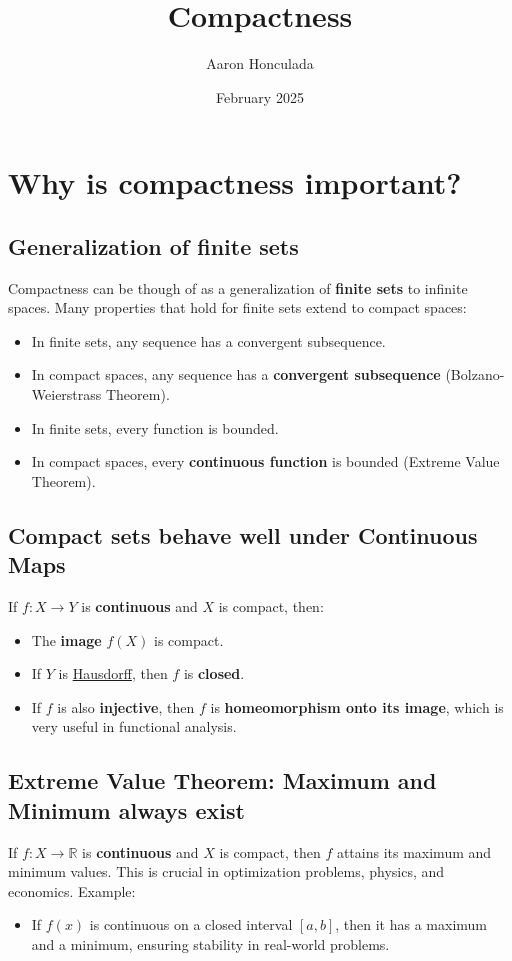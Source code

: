\documentclass{article}
\title{Compactness}
\author{Aaron Honculada}
\date{February 2025}
\begin{document}
\maketitle

\section{Why is compactness important?}
\subsection{Generalization of finite sets}
Compactness can be though of as a generalization of \textbf{finite sets} to infinite spaces. Many properties
that hold for finite sets extend to compact spaces:
\begin{itemize}
    \item In finite sets, any sequence has a convergent subsequence.
    \item In compact spaces, any sequence has a \textbf{convergent subsequence} (Bolzano-Weierstrass Theorem).
    \item In finite sets, every function is bounded.
    \item In compact spaces, every \textbf{continuous function} is bounded (Extreme Value Theorem).
\end{itemize}

\subsection{Compact sets behave well under Continuous Maps}
If $f: X \to Y$ is \textbf{continuous} and $X$ is compact, then:
\begin{itemize}
    \item The \textbf{image} $f(X)$ is compact.
    \item If $Y$ is \href{run:../hausdorff/hausdorff.pdf#nameddest=hausdorff-definition}{Hausdorff}, then $f$ is \textbf{closed}.
    \item If $f$ is also \textbf{injective}, then $f$ is \textbf{homeomorphism onto its image}, which
    is very useful in functional analysis.
\end{itemize}

\subsection{Extreme Value Theorem: Maximum and Minimum always exist}
If $f: X \to \mathbb{R}$ is \textbf{continuous} and $X$ is compact, then $f$ attains its maximum and minimum values.
This is crucial in optimization problems, physics, and economics.
Example:
\begin{itemize}
    \item If $f(x)$ is continuous on a closed interval $[a, b]$, then it has a maximum and a minimum, 
    ensuring stability in real-world problems.
\end{itemize}
\end{document}
